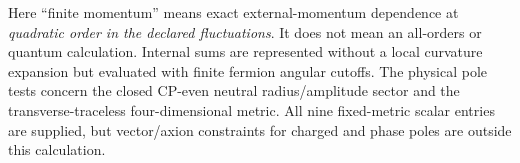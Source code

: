 \documentclass[11pt,letterpaper]{article}
\begin{document}
Here ``finite momentum'' means exact external-momentum dependence at \emph{quadratic order in the declared fluctuations}. It does not mean an all-orders or quantum calculation. Internal sums are represented without a local curvature expansion but evaluated with finite fermion angular cutoffs. The physical pole tests concern the closed CP-even neutral radius/amplitude sector and the transverse-traceless four-dimensional metric. All nine fixed-metric scalar entries are supplied, but vector/axion constraints for charged and phase poles are outside this calculation.




\end{document}
